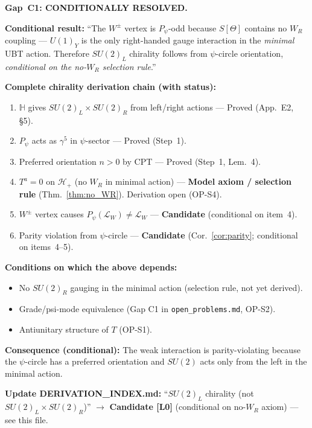 \documentclass[12pt,a4paper]{article}
\theoremstyle{definition}
\theoremstyle{remark}
\begin{document}
\begin{resultbox}
\textbf{Gap~C1: CONDITIONALLY RESOLVED.}

\textbf{Conditional result:} ``The $W^\pm$ vertex is $P_\psi$-odd because
$S[\Theta]$ contains no $W_R$ coupling --- $U(1)_Y$ is the only right-handed
gauge interaction in the \emph{minimal} UBT action.  Therefore $SU(2)_L$
chirality follows from $\psi$-circle orientation, \emph{conditional on the
no-$W_R$ selection rule}.''

\medskip
\textbf{Complete chirality derivation chain (with status):}
\begin{enumerate}
  \item $\mathbb{H}$ gives $SU(2)_L\times SU(2)_R$ from left/right actions
        --- Proved (App.~E2, §5).
  \item $P_\psi$ acts as $\gamma^5$ in $\psi$-sector --- Proved (Step~1).
  \item Preferred orientation $n>0$ by CPT --- Proved (Step~1, Lem.~4).
  \item $T^a = 0$ on $\mathcal{H}_+$ (no $W_R$ in minimal action)
        --- \textbf{Model axiom / selection rule} (Thm.~\ref{thm:no_WR}).
        Derivation open (OP-S4).
  \item $W^\pm$ vertex causes $P_\psi(\mathcal{L}_W)\neq\mathcal{L}_W$
        --- \textbf{Candidate} (conditional on item~4).
  \item Parity violation from $\psi$-circle --- \textbf{Candidate}
        (Cor.~\ref{cor:parity}; conditional on items~4--5).
\end{enumerate}

\medskip
\textbf{Conditions on which the above depends:}
\begin{itemize}
  \item No $SU(2)_R$ gauging in the minimal action (selection rule, not yet derived).
  \item Grade/psi-mode equivalence (Gap C1 in \texttt{open\_problems.md}, OP-S2).
  \item Antiunitary structure of $T$ (OP-S1).
\end{itemize}

\medskip
\textbf{Consequence (conditional):} The weak interaction is parity-violating
because the $\psi$-circle has a preferred orientation and $SU(2)$ acts only
from the left in the minimal action.

\textbf{Update DERIVATION\_INDEX.md:} ``$SU(2)_L$ chirality (not $SU(2)_L\times
SU(2)_R$)'' $\to$ \textbf{Candidate [L0]} (conditional on no-$W_R$ axiom)
--- see this file.
\end{resultbox}

\ifdefined\INCLUDEMODE
\else
  
\end{document}
